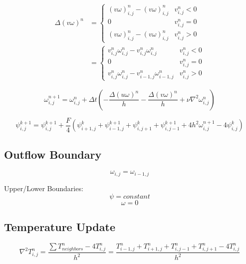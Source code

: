 \begin{equation}
    \begin{split}
    \Delta (v \omega)^n  & = \begin{cases} 
          (v\omega)_{i, j}^{n} - (v\omega)_{i, j}^{n} & v_{i, j}^n < 0 \\
          0 & v_{i, j}^n = 0 \\
          (v\omega)_{i, j}^{n} - (v\omega)_{i, j}^{n} & v_{i, j}^n > 0 
       \end{cases} \\
        & = \begin{cases} 
              v_{i, j}^{n}\omega_{i, j}^{n} - v_{i, j}^{n}\omega_{i, j}^{n} & v_{i, j}^n < 0 \\
              0 & v_{i, j}^n = 0 \\
              v_{i, j}^{n}\omega_{i, j}^{n} - v_{i - 1, j}^{n}\omega_{i - 1, j}^{n} & v_{i, j}^n > 0 
           \end{cases}
    \end{split}
\end{equation}


\begin{equation}
    \omega_{i, j}^{n + 1} = \omega_{i, j}^{n} + \Delta t \left( -\frac{\Delta(u \omega)^n}{h} - \frac{\Delta(v \omega) ^n}{h} + \nu \nabla^2\omega_{i, j}^{n} \right)
\end{equation}

\begin{equation}
    \psi_{i, j}^{k + 1} =  \psi_{i, j}^{k + 1} + \frac{F}{4} \left( \psi_{i + 1, j}^{k} + \psi_{i - 1, j}^{k + 1} + \psi_{i, j + 1}^{k} + \psi_{i, j - 1}^{k + 1} + 4 h^2 \omega_{i, j}^{n + 1} - 4\psi_{i, j}^{k} \right)
\end{equation}

\subsection{Outflow Boundary}
\begin{equation}
    \omega_{i, j} = \omega_{i - 1, j}
\end{equation}

Upper/Lower Boundaries: 
\begin{equation}
    \psi = constant
\end{equation}
\begin{equation}
    \omega = 0
\end{equation}


\subsection{Temperature Update}
\begin{equation}
    \nabla^2 T_{i, j}^{n} = \frac{\sum T_{neighbors}^{n} - 4 T_{i, j}^{n}}{h^2} = \frac{T_{i - 1, j}^{n} + T_{i + 1, j}^{n} + T_{i, j - 1}^{n} + T_{i, j + 1}^{n} - 4 T_{i, j}^{n}}{h^2}
\end{equation}


